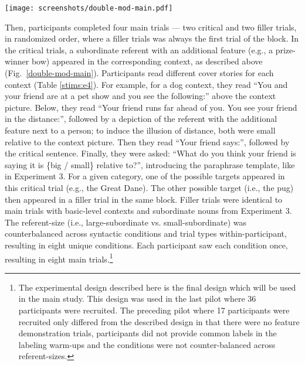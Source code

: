 \begin{figure*}[t]
	\begin{center}
		\texttt{[image: screenshots/double-mod-main.pdf]}
	\end{center}
	\vspace{-0.5cm}
	\caption{Example critical main trial in Experiment 4: Participants see a dog-context and read the corresponding cover story. The small-subordinate referent is described by a predicate-noun sentence.}
	\label{double-mod-main}
\end{figure*} 
Then, participants completed four main trials --- two critical and two filler trials, in randomized order, where a filler trials was always the first trial of the block. In the critical trials, a subordinate referent with an additional feature (e.g., a prize-winner bow) appeared in the corresponding context, as described above (Fig.~\ref{double-mod-main}). Participants read different cover stories for each context (Table \ref{stims:e4}).  For example, for a dog context, they read “You and your friend are at a pet show and you see the following:” above the context picture. Below, they read “Your friend runs far ahead of you. You see your friend in the distance:”, followed by a depiction of the referent with the additional feature next to a person; to induce the illusion of distance, both were small relative to the context picture. Then they read “Your friend says:”, followed by the critical sentence. Finally, they were asked: “What do you think your friend is saying it is \{big / small\} relative to?”, introducing the paraphrase template, like in Experiment 3. For a given category, one of the possible targets appeared in this critical trial (e.g., the Great Dane). The other possible target (i.e., the pug) then appeared in a filler trial in the same block. Filler trials were identical to main trials with basic-level contexts and subordinate nouns from Experiment 3. The referent-size (i.e., large-subordinate vs. small-subordinate) was counterbalanced across syntactic conditions and trial types within-participant, resulting in eight unique conditions. Each participant saw each condition once, resulting in eight main trials.\footnote{The experimental design described here is the final design which will be used in the main study. This design was used in the last pilot where 36 participants were recruited. The preceding pilot where 17 participants were recruited only differed from the described design in that there were no feature demonstration trials, participants did not provide common labels in the labeling warm-ups and the conditions were not counter-balanced across referent-sizes.}

